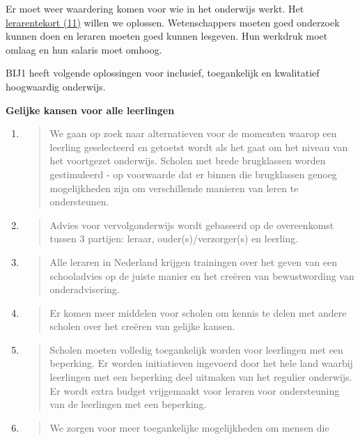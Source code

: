 Er moet weer waardering komen voor wie in het onderwijs werkt. Het
\underline{lerarentekort (11)} willen we oplossen. Wetenschappers moeten
goed onderzoek kunnen doen en leraren moeten goed kunnen lesgeven. Hun
werkdruk moet omlaag en hun salaris moet omhoog.

BIJ1 heeft volgende oplossingen voor inclusief, toegankelijk en
kwalitatief hoogwaardig onderwijs.

\textbf{Gelijke kansen voor alle leerlingen}

\begin{enumerate}
\def\labelenumi{\arabic{enumi}.}
\item
  \begin{quote}
  We gaan op zoek naar alternatieven voor de momenten waarop een
  leerling geselecteerd en getoetst wordt als het gaat om het niveau van
  het voortgezet onderwijs. Scholen met brede brugklassen worden
  gestimuleerd - op voorwaarde dat er binnen die brugklassen genoeg
  mogelijkheden zijn om verschillende manieren van leren te
  ondersteunen.
  \end{quote}
\item
  \begin{quote}
  Advies voor vervolgonderwijs wordt gebaseerd op de overeenkomst tussen
  3 partijen: leraar, ouder(s)/verzorger(s) en leerling.
  \end{quote}
\item
  \begin{quote}
  Alle leraren in Nederland krijgen trainingen over het geven van een
  schooladvies op de juiste manier en het creëren van bewustwording van
  onderadvisering.
  \end{quote}
\item
  \begin{quote}
  Er komen meer middelen voor scholen om kennis te delen met andere
  scholen over het creëren van gelijke kansen.
  \end{quote}
\item
  \begin{quote}
  Scholen moeten volledig toegankelijk worden voor leerlingen met een
  beperking. Er worden initiatieven ingevoerd door het hele land waarbij
  leerlingen met een beperking deel uitmaken van het regulier onderwijs.
  Er wordt extra budget vrijgemaakt voor leraren voor ondersteuning van
  de leerlingen met een beperking.
  \end{quote}
\item
  \begin{quote}
  We zorgen voor meer toegankelijke mogelijkheden om mensen die

\end{quote}
\end{enumerate}
